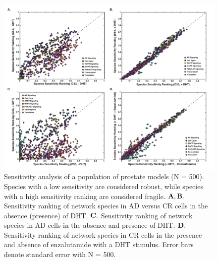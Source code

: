 \documentclass[12pt]{article}
\begin{document}
\clearpage

\begin{figure}\centering
\includegraphics[width=1.0\textwidth]{./figs/Fig_5_Sensitivity.pdf}
\caption{Sensitivity analysis of a population of prostate models (N = 500). Species with a low sensitivity are considered robust, while species with a high sensitivity ranking are considered fragile. $\bf{A,B.}$ Sensitivity ranking of network species in AD versus CR cells in the absence (presence) of DHT. $\bf{C.}$ Sensitivity ranking of network species in AD cells in the absence and presence of DHT. $\bf{D.}$ Sensitivity ranking of network species in CR cells in the presence and absence of enzalutamide with a DHT stimulus. Error bars denote standard error with N = 500.}
\label{fg:Sensitivity}
\end{figure}

\clearpage
\end{document}
